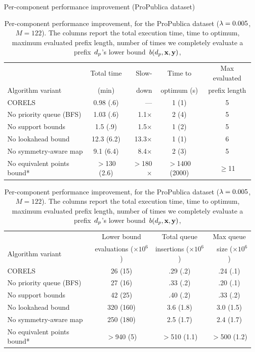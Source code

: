 \begin{table}[t!]
\centering
Per-component performance improvement (ProPublica dataset) \\
\vspace{1mm}
\begin{tabular}{l | c  r | c | c}
& Total time & Slow- & Time to & Max evaluated \\
Algorithm variant & (min) & down & optimum (s) & prefix length \\
\hline
CORELS & 0.98 (.6) & --- & 1 (1) & 5 \\
No priority queue (BFS) & 1.03 (.6) & 1.1$\times$ & 2 (4) & 5 \\
No support bounds & 1.5 (.9) & 1.5$\times$ & 1 (2) & 5 \\
No lookahead bound & 12.3 (6.2) & 13.3$\times$ & 1 (1) & 6 \\
No symmetry-aware map & 9.1 (6.4) & 8.4$\times$ & 2 (3) & 5 \\
No equivalent points bound* & $>$130 (2.6) & $>$180$\times$ & $>$1400 (2000) & $\ge$11 \\
\hline
\end{tabular}
\begin{tabular}{l | c | c | c}
\hline
 & Lower bound & Total queue &  Max queue \\
Algorithm variant & evaluations ($\times 10^6$) & insertions ($\times 10^6$) &~ size ($\times 10^6$) \\
\hline
CORELS & 26 (15) & .29 (.2) & .24 (.1) \\
No priority queue (BFS) & 27 (16) & .33 (.2) & .20 (.1) \\
No support bounds & 42 (25) & .40 (.2) & .33 (.2) \\
No lookahead bound & 320 (160) & 3.6 (1.8) & 3.0 (1.5) \\
No symmetry-aware map & 250 (180) & 2.5 (1.7) & 2.4 (1.7) \\
No equivalent points bound* & $>$940 (5) & $>$510 (1.1) & $>$500 (1.2) \\
\end{tabular}
\caption{Per-component performance improvement, for the ProPublica dataset
(${{\lambda} = 0.005}$, ${M = 122}$).
%
The columns report the total execution time,
time to optimum, maximum evaluated prefix length,
number of times we completely evaluate a prefix~$d_p$'s lower bound~$b(d_p, \mathbf{x}, \mathbf{y})$,
}
\end{table}
